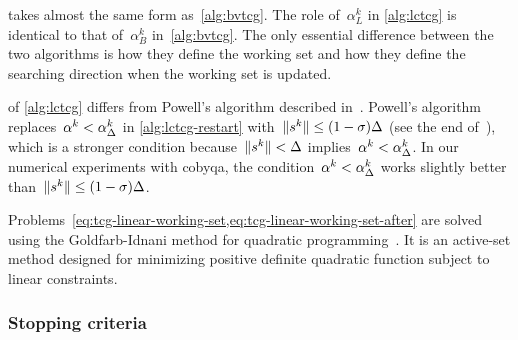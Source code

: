 \begin{algorithm}
{        
    }
\end{algorithm}

 takes almost the same form as~\cref{alg:bvtcg}.
The role of~$\alpha_{L}^k$ in \cref{alg:lctcg} is identical to that of~$\alpha_{B}^k$ in~\cref{alg:bvtcg}.
The only essential difference between the two algorithms is how they define the working set and how
they define the searching direction when the working set is updated.

 of \cref{alg:lctcg} differs from Powell's algorithm described in~\cite[\S~3,\S~5]{Powell_2015}.
Powell's algorithm replaces~$\alpha^k < \alpha_{\rad}^k$ in \cref{alg:lctcg-restart} with~$\norm{\sstep[k]} \le (1-\sigma)\rad$ (see the end of~\cite[\S~3]{Powell_2015}),
which is a stronger condition because~$\norm{\sstep[k]} < \rad$ implies~$\alpha^k < \alpha_{\rad}^k$.
In our numerical experiments with \gls{cobyqa}, the condition~$\alpha^k < \alpha_{\rad}^k$ works slightly better than~$\norm{\sstep[k]} \le (1-\sigma)\rad$.

Problems~\cref{eq:tcg-linear-working-set,eq:tcg-linear-working-set-after} are solved using the Goldfarb-Idnani method for quadratic programming~\cite{Goldfarb_Idnani_1983}.
It is an active-set method designed for minimizing positive definite quadratic function subject to linear constraints.

\subsubsection{Stopping criteria}

